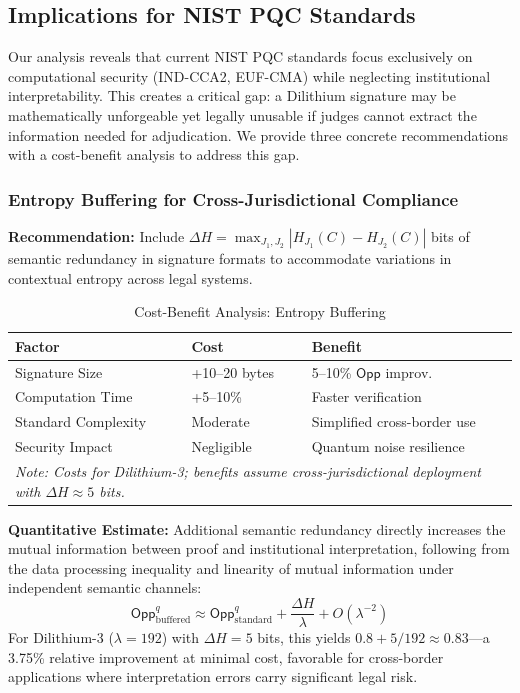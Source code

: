 \documentclass{ieeeaccess}
\newcommand{\Opp}{\mathsf{Opp}}
\begin{document}
\subsection{Implications for NIST PQC Standards}

Our analysis reveals that current NIST PQC standards focus exclusively on 
computational security (IND-CCA2, EUF-CMA) while neglecting institutional 
interpretability. This creates a critical gap: a Dilithium signature may be 
mathematically unforgeable yet legally unusable if judges cannot extract 
the information needed for adjudication. We provide three concrete 
recommendations with a cost-benefit analysis to address this gap.

\subsubsection{Entropy Buffering for Cross-Jurisdictional Compliance}

\textbf{Recommendation:} Include $\Delta H = \max_{J_1, J_2} |H_{J_1}(C) - H_{J_2}(C)|$ 
bits of semantic redundancy in signature formats to accommodate variations in 
contextual entropy across legal systems.

\begin{table}[h]
\centering
\caption{Cost-Benefit Analysis: Entropy Buffering}
\label{tab:entropy_buffering}
\small
\setlength{\tabcolsep}{3pt}
\begin{tabular}{p{3.0cm}p{2.2cm}p{2.2cm}}
\toprule
\textbf{Factor} & \textbf{Cost} & \textbf{Benefit} \\
\midrule
Signature Size & +10--20 bytes & 5--10\% $\Opp$ improv. \\
Computation Time & +5--10\% & Faster verification \\
Standard Complexity & Moderate & Simplified cross-border use \\
Security Impact & Negligible & Quantum noise resilience \\
\midrule
\multicolumn{3}{p{7.4cm}}{\footnotesize \textit{Note: Costs for Dilithium-3; benefits assume cross-jurisdictional deployment with $\Delta H \approx 5$ bits.}} \\
\bottomrule
\end{tabular}
\end{table}

\textbf{Quantitative Estimate:} Additional semantic redundancy directly increases 
the mutual information between proof and institutional interpretation, following 
from the data processing inequality and linearity of mutual information under 
independent semantic channels:
\begin{equation}
    \Opp^q_{\text{buffered}} \approx \Opp^q_{\text{standard}} + \frac{\Delta H}{\lambda} + O(\lambda^{-2})
\end{equation}
For Dilithium-3 ($\lambda = 192$) with $\Delta H = 5$ bits, this yields 
$0.8 + 5/192 \approx 0.83$—a 3.75\% relative improvement at minimal cost, 
favorable for cross-border applications where interpretation errors carry 
significant legal risk.
\end{document}
